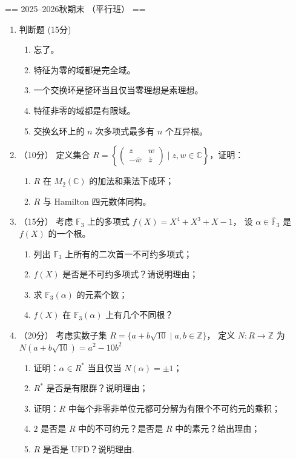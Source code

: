 \def\Q{\mathbb{Q}}
\def\C{\mathbb{C}}

== 2025--2026秋期末 （平行班） ==
\begin{enumerate}
\item 判断题 (15分)
\begin{enumerate}
    \item 忘了。
    \item 特征为零的域都是完全域。
    \item 一个交换环是整环当且仅当零理想是素理想。
    \item 特征非零的域都是有限域。
    \item 交换幺环上的 $n$ 次多项式最多有 $n$ 个互异根。
\end{enumerate}
\item （10分）
定义集合 $R = \left\{ \begin{pmatrix}z & w \\ -\overline{w} & \overline{z}\end{pmatrix} \mid z, w \in \mathbb{C} \right\}$，证明：
\begin{enumerate}
    \item $R$ 在 $M_{2}(\mathbb{C})$ 的加法和乘法下成环；
    \item $R$ 与 Hamilton 四元数体同构。
\end{enumerate}

\item （15分）
考虑 $\mathbb{F}_{3}$ 上的多项式 $f(X) = X^{4} + X^{3} + X - 1$，
设 $\alpha \in \overline{\mathbb{F}}_{3}$ 是 $f(X)$ 的一个根。
\begin{enumerate}
    \item 列出 $\mathbb{F}_{3}$ 上所有的二次首一不可约多项式；
    \item $f(X)$ 是否是不可约多项式？请说明理由；
    \item 求 $\mathbb{F}_{3}(\alpha)$ 的元素个数；
    \item $f(X)$ 在 $\mathbb{F}_{3}(\alpha)$ 上有几个不同根？
\end{enumerate}

\item （20分）
考虑实数子集 $R = \{ a + b\sqrt{10} \mid a, b \in \mathbb{Z} \}$，
定义 $N: R \rightarrow \mathbb{Z}$ 为 $N(a + b\sqrt{10}) = a^{2} - 10b^{2}$
\begin{enumerate}
    \item 证明：$\alpha \in R^{*}$ 当且仅当 $N(\alpha) = \pm 1$；
    \item $R^{*}$ 是否是有限群？说明理由；
    \item 证明：$R$ 中每个非零非单位元都可分解为有限个不可约元的乘积；
    \item $2$ 是否是 $R$ 中的不可约元？是否是 $R$ 中的素元？给出理由；
    \item $R$ 是否是 UFD？说明理由.
\end{enumerate}


\end{enumerate}
